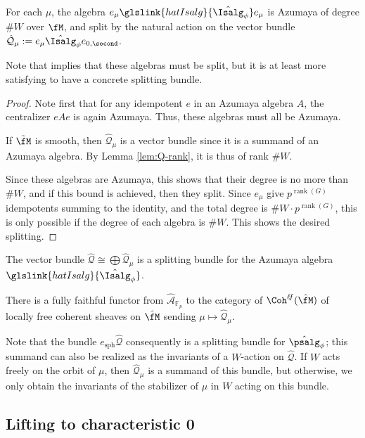 \begin{lemma}
  For each $\mu$, the algebra $e_\mu\glslink{hatIsalg}{\hat{\Isalg}_\phi} e_\mu$ is Azumaya of degree $\#W$ over $\fM$, and split by the natural action on the vector bundle $\mathcal{\hat Q}_\mu:=e_\mu\hat{\Isalg}_\phi e_{0,\second}$.
\end{lemma}
Note that \cite[Prop. 1.24]{BKpos} implies that these algebras must be split, but it is at least more satisfying to have a concrete splitting bundle. 
\begin{proof}
 Note first that for any idempotent $e$ in an Azumaya algebra $A$, the centralizer $eAe$ is again Azumaya.  Thus, these algebras must all be Azumaya.

 If $\tilde{\fM}$ is smooth, then  $\mathcal{\hat Q}_\mu$ is a vector bundle since it is a summand of an Azumaya algebra.  By Lemma \ref{lem:Q-rank}, it is thus of rank $\#W$.
  
  Since these algebras are Azumaya, this shows that their degree is no more than $\# W$, and if this bound is achieved, then they split. Since $e_\mu$ give $p^{\operatorname{rank}(G)}$ idempotents summing to the identity, and the total degree is $\# W\cdot p^{\operatorname{rank}(G)}$, this is only possible if the degree of each algebra is $\#W$. This shows the desired splitting.
\end{proof}

\begin{corollary}\label{cor:Q-splitting}
  The vector bundle $\hat{\mathcal{Q}}\cong \bigoplus \hat{\mathcal{Q}}_\mu$ is a splitting bundle for the Azumaya algebra $\glslink{hatIsalg}{\hat{\Isalg}_\phi}$.

There is a fully faithful functor from  $\widehat{\mathscr{A}}_{\mathbb{F}_p}$ to the category of $\Coh^{\ell \!f}(\hat{\fM})$ of locally free coherent sheaves on $\hat{\fM}$ sending  $\mu\mapsto \hat{\mathcal{Q}}_\mu$.  
\end{corollary}

Note that the bundle $e_{\operatorname{sph}}\hat{\mathcal{Q}}$ consequently is a splitting bundle for $\hat{\psalg} _\phi$; this summand can also be realized 
as the invariants of a $W$-action on $\hat{\mathcal{Q}}$.   If $W$ acts freely on the orbit of $\mu$, then $\hat{\mathcal{Q}}_\mu$ is a summand of this bundle, but otherwise, we only obtain the invariants of the stabilizer of $\mu$ in $W$ acting on this bundle.


\subsection{Lifting to characteristic 0}


